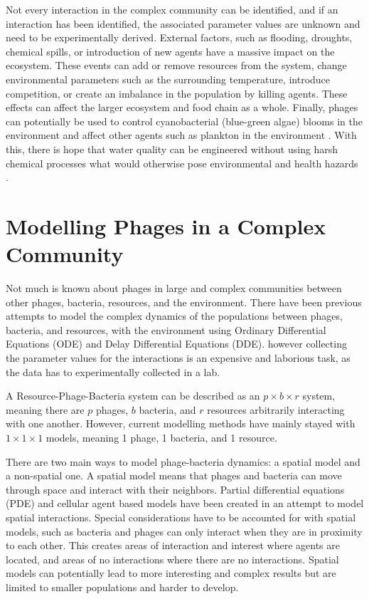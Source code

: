 Not every interaction in the complex community can be identified, and if an interaction has been identified, the associated parameter values are unknown and need to be experimentally derived. 
External factors, such as flooding, droughts, chemical spills, or introduction of new agents have a massive impact on the ecosystem. 
These events can add or remove resources from the system, change environmental parameters such as the surrounding temperature, introduce competition, or create an imbalance in the population by killing agents. 
These effects can affect the larger ecosystem and food chain as a whole. 
Finally, phages can potentially be used to control cyanobacterial (blue-green algae) blooms in the environment and affect other agents such as plankton in the environment \cite{colomaFrequencyVirusresistantHosts2019}. 
With this, there is hope that water quality can be engineered without using harsh chemical processes what would otherwise pose environmental and health hazards \cite{tuckerIdentificationCyanophageMaLBP2005}. \newline
\newline

\section{Modelling Phages in a Complex Community}
Not much is known about phages in large and complex communities between other phages, bacteria, resources, and the environment. 
There have been previous attempts to model the complex dynamics of the populations between phages, bacteria, and resources, with the environment using Ordinary Differential Equations (ODE) and Delay Differential Equations (DDE).
however collecting the parameter values for the interactions is an expensive and laborious task, as the data has to experimentally collected in a lab. \newline 

A Resource-Phage-Bacteria system can be described as an $p\times b \times r$ system, meaning there are $p$ phages, $b$ bacteria, and $r$ resources arbitrarily interacting with one another. 
However, current modelling methods have mainly stayed with $1\times 1 \times 1$ models, meaning 1 phage, 1 bacteria, and 1 resource. \newline 

There are two main ways to model phage-bacteria dynamics: a spatial model and a non-spatial one.
A spatial model means that phages and bacteria can move through space and interact with their neighbors. 
Partial differential equations (PDE) and cellular agent based models have been created in an attempt to model spatial interactions.
Special considerations have to be accounted for with spatial models, such as bacteria and phages can only interact when they are in proximity to each other.
This creates areas of interaction and interest where agents are located, and areas of no interactions where there are no interactions.
Spatial models can potentially lead to more interesting and complex results but are limited to smaller populations and harder to develop. \newline 

